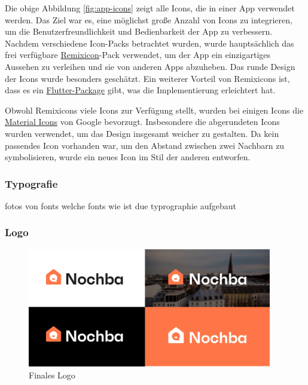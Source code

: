 Die obige Abbildung \ref{fig:app-icons} zeigt alle Icons,
die in einer App verwendet werden. Das Ziel war es, eine
möglichst große Anzahl von Icons zu integrieren, um die
Benutzerfreundlichkeit und Bedienbarkeit der App zu
verbessern. Nachdem verschiedene Icon-Packs betrachtet
wurden, wurde hauptsächlich das frei verfügbare
\href{https://github.com/Remix-Design/remixicon}{Remixicon}-Pack
verwendet, um der App ein einzigartiges Aussehen zu
verleihen und sie von anderen Apps abzuheben. Das runde
Design der Icons wurde besonders geschätzt. Ein weiterer
Vorteil von Remixicons ist, dass es ein
\href{https://pub.dev/packages/remixicon}{Flutter-Package}
gibt, was
die Implementierung erleichtert hat.

Obwohl Remixicons viele Icons zur Verfügung stellt, wurden
bei einigen Icons die
\href{https://fonts.google.com/icons?icon.set=Material+Icons}{Material Icons}
von Google bevorzugt.
Insbesondere die abgerundeten Icons wurden verwendet, um das
Design insgesamt weicher zu gestalten. Da kein passendes
Icon vorhanden war, um den Abstand zwischen zwei Nachbarn zu
symbolisieren, wurde ein neues Icon im Stil der anderen
entworfen.

\subsubsection{Typografie}
fotos von fonts
welche fonts
wie ist due typrographie aufgebaut
\subsubsection{Logo}

\begin{figure}[ht]
  \centering
  \includegraphics[width=0.95\textwidth]{pics/final-logo.png}
  \caption{Finales Logo}
  \label{fig:final-logo}
\end{figure}


